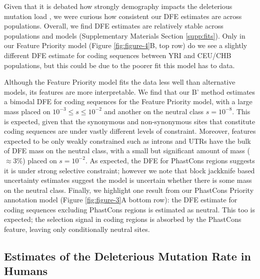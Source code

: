 \documentclass[11pt]{article}
\begin{document}
Given that it is debated how strongly demography impacts the deleterious
mutation load
\parencite{Torres2018-ni,Torres2020-hc,Lohmueller2008-qi,Simons2014-sv,Simons2016-cs},
we were curious how consistent our DFE estimates are across populations.
Overall, we find DFE estimates are relatively stable across populations and
models (Supplementary Materials Section \ref{supp:fits}). Only in our Feature
Priority model (Figure \ref{fig:figure-4}B, top row) do we see a slightly
different DFE estimate for coding sequences between YRI and CEU/CHB
populations, but this could be due to the poorer fit this model has to data.

Although the Feature Priority model fits the data less well than alternative
models, its features are more interpretable. We find that our B' method
estimates a bimodal DFE for coding sequences for the Feature Priority model,
with a large mass placed on $10^{-3} \le s \le 10^{-2}$ and another on the
neutral class $s=10^{-8}$. This is expected, given that the synonymous and
non-synonymous sites that constitute coding sequences are under vastly
different levels of constraint. Moreover, features expected to be only weakly
constrained such as introns and UTRs have the bulk of DFE mass on the neutral
class, with a small but significant amount of mass ($\approx 3\%$) placed on
$s=10^{-2}$. As expected, the DFE for PhastCons regions suggests it is under
strong selective constraint; however we note that block jackknife based
uncertainty estimates suggest the model is uncertain whether there is some mass
on the neutral class. Finally, we highlight one result from our PhastCons
Priority annotation model (Figure \ref{fig:figure-3}A bottom row): the DFE
estimate for coding sequences excluding PhastCons regions is estimated as
neutral. This too is expected; the selection signal in coding regions is
absorbed by the PhastCons feature, leaving only conditionally neutral sites.

\subsection*{Estimates of the Deleterious Mutation Rate in Humans}
\end{document}
